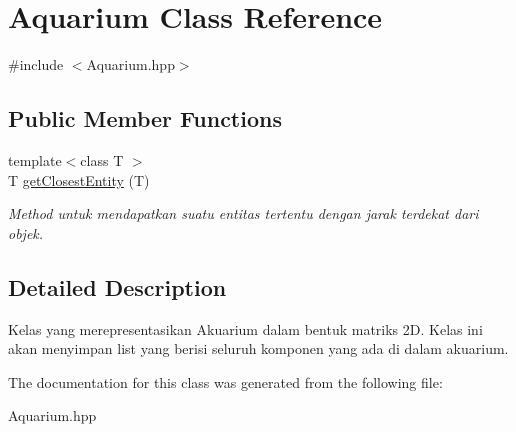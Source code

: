 \hypertarget{classAquarium}{}\section{Aquarium Class Reference}
\label{classAquarium}


{\ttfamily \#include $<$Aquarium.\+hpp$>$}

\subsection*{Public Member Functions}
\begin{DoxyCompactItemize}
\item 
\mbox{\label{classAquarium_aa1389622ce9474dbdc955e04b6efd1dc}} 
{\footnotesize template$<$class T $>$ }\\T \hyperlink{classAquarium_aa1389622ce9474dbdc955e04b6efd1dc}{get\+Closest\+Entity} (T)
\begin{DoxyCompactList}\small\item\em Method untuk mendapatkan suatu entitas tertentu dengan jarak terdekat dari objek. \end{DoxyCompactList}\end{DoxyCompactItemize}


\subsection{Detailed Description}
Kelas yang merepresentasikan Akuarium dalam bentuk matriks 2D. Kelas ini akan menyimpan list yang berisi seluruh komponen yang ada di dalam akuarium. 

The documentation for this class was generated from the following file\+:\begin{DoxyCompactItemize}
\item 
Aquarium.\+hpp\end{DoxyCompactItemize}
